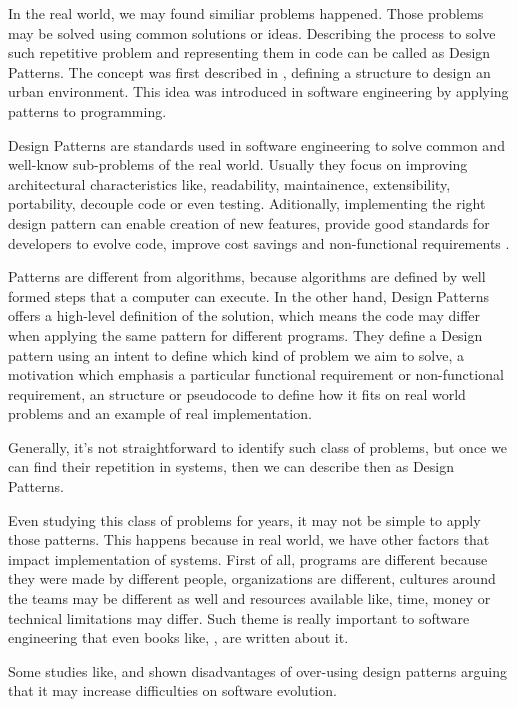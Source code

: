 \documentclass[conference]{IEEEtran}
\begin{document}
In the real world, we may found similiar problems happened. Those problems may be solved using common solutions or ideas.
Describing the process to solve such repetitive problem and representing them in code can be called as Design Patterns. 
The concept was first described in \cite{AlexanderEA.1977}, defining a structure to design an urban environment. 
This idea was introduced in software engineering by \cite{gamma1994design} applying patterns to programming.

Design Patterns are standards used in software engineering to solve common and well-know sub-problems of the real world.
Usually they focus on improving architectural characteristics like, readability, maintainence, extensibility, portability, decouple code or even testing.
Aditionally, implementing the right design pattern can enable creation of new features, provide good standards for developers to evolve code, improve cost savings and non-functional requirements \cite{988711}.

Patterns are different from algorithms, because algorithms are defined by well formed steps that a computer can execute\cite{}.
In the other hand, Design Patterns offers a high-level definition of the solution, which means the code may differ when applying the same pattern for different programs. 
They define a Design pattern using an intent to define which kind of problem we aim to solve, a motivation which emphasis a particular functional requirement or non-functional requirement, an structure or pseudocode to define how it fits on real world problems and an example of real implementation.

Generally, it's not straightforward to identify such class of problems, but once we can find their repetition in systems, then we can describe then as Design Patterns.

Even studying this class of problems for years\cite{}, it may not be simple to apply those patterns. 
This happens because in real world, we have other factors that impact implementation of systems. 
First of all, programs are different because they were made by different people, organizations are different, cultures around the teams may be different as well and resources available like, time, money or technical limitations may differ.
Such theme is really important to software engineering that even books like, \cite{}, are written about it.

Some studies like, \cite{4493325} and \cite{4301130} shown disadvantages of over-using design patterns arguing that it may increase difficulties on software evolution.
\end{document}
